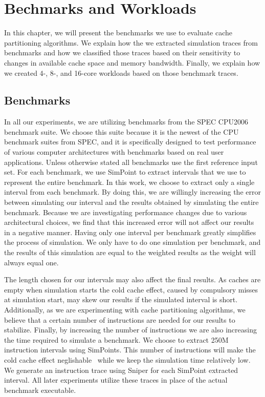 
\chapter{Bechmarks and Workloads}
\label{cpt:benchmarks_workloads}

In this chapter, we will present the benchmarks we use to evaluate cache partitioning algorithms.
We explain how the we extracted simulation traces from benchmarks and how we classified those traces based on their sensitivity to changes in available cache space and memory bandwidth. 
Finally, we explain how we created 4-, 8-, and 16-core workloads based on those benchmark traces.

\section{Benchmarks}

In all our experiments, we are utilizing benchmarks from the SPEC CPU2006~\cite{SPECCPU2006} benchmark suite. 
We choose this suite because it is the newest of the CPU benchmark suites from SPEC, and it is specifically designed to test performance of various computer architectures with benchmarks based on real user applications.
Unless otherwise stated all benchmarks use the first reference input set.
For each benchmark, we use SimPoint\cite{Hamerly2005} to extract intervals that we use to represent the entire benchmark.
In this work, we choose to extract only a single interval from each benchmark.
By doing this, we are willingly increasing the error\cite{Hamerly2004} between simulating our interval and the results obtained by simulating the entire benchmark.
Because we are investigating performance changes due to various architectural choices, we find that this increased error will not affect our results in a negative manner.
Having only one interval per benchmark greatly simplifies the process of simulation.
We only have to do one simulation per benchmark, and the results of this simulation are equal to the weighted results as the weight will always equal one.

The length chosen for our intervals may also affect the final results.
As caches are empty when simulation starts the cold cache effect, caused by compulsory misses at simulation start, may skew our results if the simulated interval is short.
Additionally, as we are experimenting with cache partitioning algorithms, we believe that a certain number of instructions are needed for our results to stabilize.
Finally, by increasing the number of instructions we are also increasing the time required to simulate a benchmark.
We choose to extract 250M instruction intervals using SimPoints.
This number of instructions will make the cold cache effect neglishable~\cite{Hamerly2005,Hamerly2004,Olsen2014} while we keep the simulation time relatively low.
We generate an instruction trace using Sniper for each SimPoint extracted interval.
All later experiments utilize these traces in place of the actual benchmark executable.

